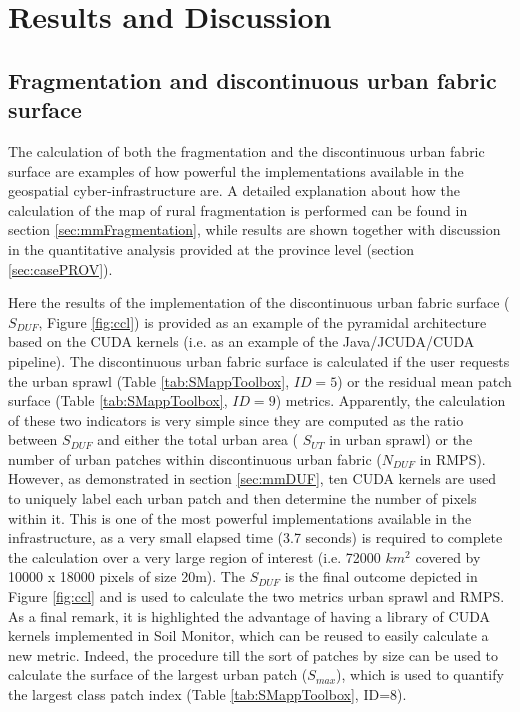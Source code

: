 \documentclass[APA,LATO1COL,doublespace]{WileyNJD-v2}
\begin{document}
\section{ Results and Discussion }
\label{sec:results}

\subsection{ Fragmentation and discontinuous urban fabric surface }
\label{sec:resFRAG_DUF}
The calculation of both the fragmentation and the discontinuous urban fabric surface are examples of how powerful the implementations available in the geospatial cyber-infrastructure are.
A detailed explanation about how the calculation of the map of rural fragmentation is performed can be found in section \ref{sec:mmFragmentation}, while results are shown
 together with discussion
in the quantitative analysis provided at the province level (section \ref{sec:casePROV}).%

Here the results of the implementation of the discontinuous urban fabric surface ($S_{DUF}$, Figure \ref{fig:ccl}) is provided as an example of the pyramidal architecture based on the CUDA kernels (i.e. as an example of the Java/JCUDA/CUDA pipeline).
The discontinuous urban fabric surface is calculated if the user requests the urban sprawl (Table \ref{tab:SMappToolbox}, $ID = 5$) or the residual mean patch surface (Table \ref{tab:SMappToolbox}, $ID = 9$) metrics.
Apparently, the calculation of these two indicators is very simple since they are computed as the ratio between 
$S_{DUF}$ and either the total urban area ( $S_{UT}$ in urban sprawl) or the number of urban patches within discontinuous urban fabric ($N_{DUF}$ in RMPS).
However, as demonstrated in section \ref{sec:mmDUF}, ten CUDA kernels are used to uniquely label each urban patch and then determine the number of pixels within it.
This is one of the most powerful implementations available in the infrastructure, as a very small elapsed time (3.7 seconds) is required to complete the calculation over a very large region of interest (i.e. 72000 $km^2$ covered by 10000 x 18000 pixels of size 20m).
The $S_{DUF}$ is the final outcome depicted in Figure \ref{fig:ccl} and is used to calculate the two metrics urban sprawl and RMPS.
As a final remark, it is highlighted the advantage of having a library of CUDA kernels implemented in Soil Monitor, which can be reused to easily calculate a new metric.
Indeed, the procedure till the sort of patches by size can be used to calculate the surface of the largest urban patch ($S_{max}$), which is used to quantify the largest class patch index (Table \ref{tab:SMappToolbox}, ID=8).
\end{document}
